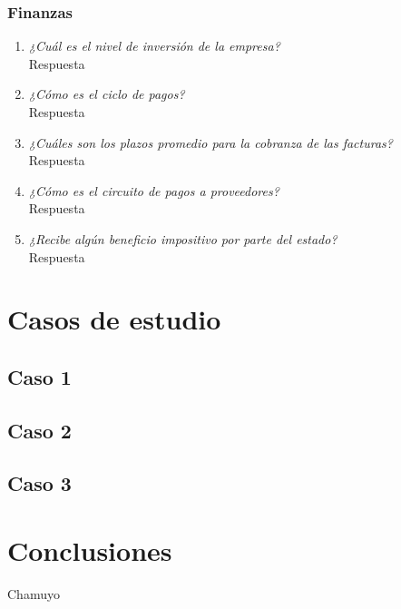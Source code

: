 \documentclass[a4paper,10pt]{article}
\begin{document}
			
		\subsubsection{Finanzas}
		
		
			\begin{enumerate}[resume]

			\item \textit{¿Cuál es el nivel de inversión de la empresa?}\\
			
			Respuesta
			
			\item \textit{¿Cómo es el ciclo de pagos?}\\

			Respuesta
			
			\item \textit{¿Cuáles son los plazos promedio para la cobranza de las facturas?}\\
			
			Respuesta
			
			\item \textit{¿Cómo es el circuito de pagos a proveedores?}\\
			
			Respuesta
			
			\item \textit{¿Recibe algún beneficio impositivo por parte del estado?}\\
			Respuesta
			
			\end{enumerate}
\section{Casos de estudio}
	\subsection{Caso 1}
	\subsection{Caso 2}
	\subsection{Caso 3}
	
\section{Conclusiones}
Chamuyo
\end{document}
